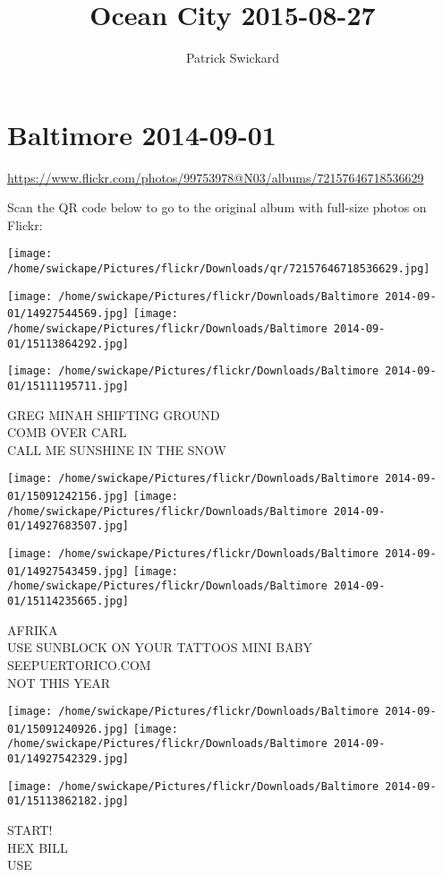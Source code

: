 \documentclass[10pt,letterpaper]{article}
\title{Ocean City 2015-08-27}
\author{Patrick Swickard}
\date{}
\begin{document}
\section*{Baltimore 2014-09-01}

\url{https://www.flickr.com/photos/99753978@N03/albums/72157646718536629}

Scan the QR code below to go to the original album with full-size photos on Flickr:

\texttt{[image: /home/swickape/Pictures/flickr/Downloads/qr/72157646718536629.jpg]}
\pagebreak

\texttt{[image: /home/swickape/Pictures/flickr/Downloads/Baltimore 2014-09-01/14927544569.jpg]}
\texttt{[image: /home/swickape/Pictures/flickr/Downloads/Baltimore 2014-09-01/15113864292.jpg]}

\vspace{0.25in}
\texttt{[image: /home/swickape/Pictures/flickr/Downloads/Baltimore 2014-09-01/15111195711.jpg]}

GREG MINAH SHIFTING GROUND\\
COMB OVER CARL\\
CALL ME SUNSHINE IN THE SNOW
\pagebreak

\texttt{[image: /home/swickape/Pictures/flickr/Downloads/Baltimore 2014-09-01/15091242156.jpg]}
\texttt{[image: /home/swickape/Pictures/flickr/Downloads/Baltimore 2014-09-01/14927683507.jpg]}

\texttt{[image: /home/swickape/Pictures/flickr/Downloads/Baltimore 2014-09-01/14927543459.jpg]}
\texttt{[image: /home/swickape/Pictures/flickr/Downloads/Baltimore 2014-09-01/15114235665.jpg]}

AFRIKA\\
USE SUNBLOCK ON YOUR TATTOOS MINI BABY\\
SEEPUERTORICO.COM\\
NOT THIS YEAR
\pagebreak

\texttt{[image: /home/swickape/Pictures/flickr/Downloads/Baltimore 2014-09-01/15091240926.jpg]}
\texttt{[image: /home/swickape/Pictures/flickr/Downloads/Baltimore 2014-09-01/14927542329.jpg]}

\vspace{0.25in}
\texttt{[image: /home/swickape/Pictures/flickr/Downloads/Baltimore 2014-09-01/15113862182.jpg]}

START!\\
HEX BILL\\
USE
\pagebreak
\end{document}
